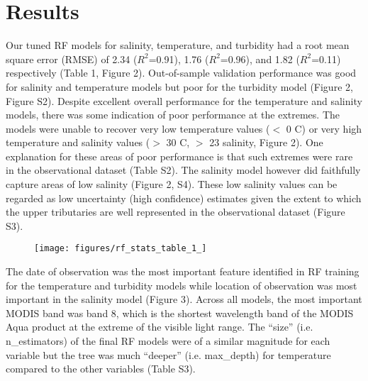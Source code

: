 \documentclass{article}
\begin{document}
\section{Results}

Our tuned RF models for salinity, temperature, and turbidity had a root mean square error (RMSE) of 2.34 ($R^2$=0.91), 1.76 ($R^2$=0.96), and 1.82 ($R^2$=0.11) respectively (Table 1, Figure 2). Out-of-sample validation performance was good for salinity and temperature models but poor for the turbidity model (Figure 2, Figure S2). Despite excellent overall performance for the temperature and salinity models, there was some indication of poor performance at the extremes. The models were unable to recover very low temperature values ($<$ 0 C) or very high temperature and salinity values ($>$ 30 C, $>$ 23 salinity, Figure 2). One explanation for these areas of poor performance is that such extremes were rare in the observational dataset (Table S2). The salinity model however did faithfully capture areas of low salinity (Figure 2, S4). These low salinity values can be regarded as low uncertainty (high confidence) estimates given the extent to which the upper tributaries are well represented in the observational dataset (Figure S3).

\begin{figure}[ht!]
    \begin{center}
          \texttt{[image: figures/rf\_stats\_table\_1\_]}          
    \end{center}    
\end{figure}


The date of observation was the most important feature identified in RF training for the temperature and turbidity models while location of observation was most important in the salinity model (Figure 3). Across all models, the most important MODIS band was band 8, which is the shortest wavelength band of the MODIS Aqua product at the extreme of the visible light range. The “size” (i.e. n\_estimators) of the final RF models were of a similar magnitude for each variable but the tree was much “deeper” (i.e. max\_depth) for temperature compared to the other variables (Table S3).
\end{document}
